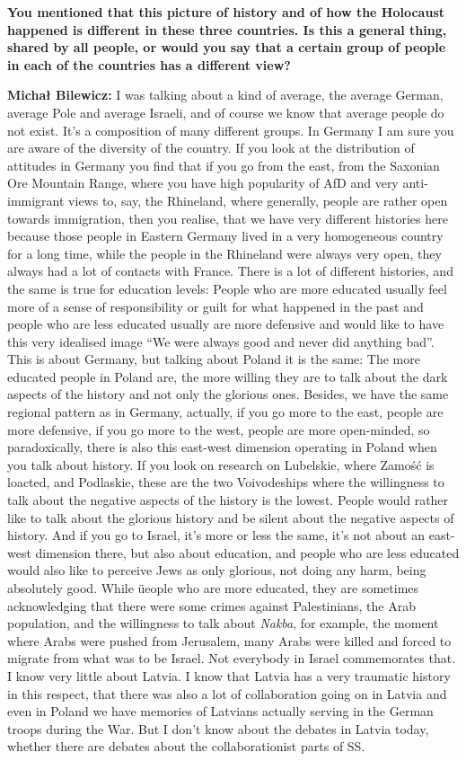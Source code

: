 \textbf{You mentioned that this picture of history and of how the Holocaust happened is different in these three countries. Is this a general thing, shared by all people, or would you say that a certain group of people in each of the countries has a different view?}

\textbf{Michał Bilewicz:} I was talking about a kind of average, the average German, average Pole and average Israeli, and of course we know that average people do not exist. It's a composition of many different groups. In Germany I am sure you are aware of the diversity of the country. If you look at the distribution of attitudes in Germany you find that if you go from the east, from the Saxonian Ore Mountain Range, where you have high popularity of AfD and very anti-immigrant views to, say, the Rhineland, where generally, people are rather open towards immigration, then you realise, that we have very different histories here because those people in Eastern Germany lived in a very homogeneous country for a long time, while the people in the Rhineland were always very open, they always had a lot of contacts with France. There is a lot of different histories, and the same is true for education levels: People who are more educated usually feel more of a sense of responsibility or guilt for what happened in the past and people who are less educated usually are more defensive and would like to have this very idealised image ``We were always good and never did anything bad''. This is about Germany, but talking about Poland it is the same: The more educated people in Poland are, the more willing they are to talk about the dark aspects of the history and not only the glorious ones. Besides, we have the same regional pattern as in Germany, actually, if you go more to the east, people are more defensive, if you go more to the west, people are more open-minded, so paradoxically, there is also this east-west dimension operating in Poland when you talk about history. If you look on research on Lubelskie, where Zamość is loacted, and Podlaskie, these are the two Voivodeships where the willingness to talk about the negative aspects of the history is the lowest. People would rather like to talk about the glorious history and be silent about the negative aspects of history. And if you go to Israel, it's more or less the same, it's not about an east-west dimension there, but also about education, and people who are less educated would also like to perceive Jews as only glorious, not doing any harm, being absolutely good. While üeople who are more educated, they are sometimes acknowledging that there were some crimes against Palestinians, the Arab population, and the willingness to talk about \textit{Nakba}, for example, the moment where Arabs were pushed from Jerusalem, many Arabs were killed and forced to migrate from what was to be Israel. Not everybody in Israel commemorates that.\\
I know very little about Latvia. I know that Latvia has a very traumatic history in this respect, that there was also a lot of collaboration going on in Latvia and even in Poland we have memories of Latvians actually serving in the German troops during the War. But I don't know about the debates in Latvia today, whether there are debates about the collaborationist parts of SS. 

